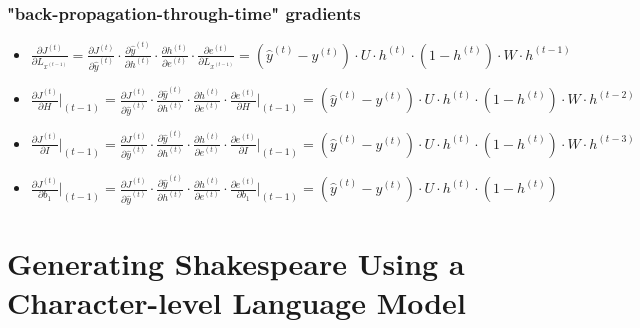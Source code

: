 \documentclass{article}
\begin{document}
\subsubsection{"back-propagation-through-time" gradients}
\begin{itemize}
    \item $\frac{\partial J^{(t)} }{\partial L_{x^{(t-1)}}} =  \frac{\partial J^{(t)} }{\partial \hat{y}^{(t)}} \cdot \frac{\partial \hat{y}^{(t)}}{\partial h^{(t)}} \cdot \frac{\partial h^{(t)}}{\partial e^{(t)}} \cdot \frac{\partial e^{(t)}}{\partial L_{x^{(t-1)}}} =
    (\hat{y}^{(t)} - y^{(t)}) \cdot U \cdot h^{(t)} \cdot (1 - h^{(t)}) \cdot W \cdot h^{(t-1)}$
    \item $\frac{\partial J^{(t)} }{\partial H} \vert_{(t-1)} =  \frac{\partial J^{(t)} }{\partial \hat{y}^{(t)}} \cdot \frac{\partial \hat{y}^{(t)}}{\partial h^{(t)}} \cdot \frac{\partial h^{(t)}}{\partial e^{(t)}} \cdot \frac{\partial e^{(t)}}{\partial H} \vert_{(t-1)} =
    (\hat{y}^{(t)} - y^{(t)}) \cdot U \cdot h^{(t)} \cdot (1 - h^{(t)}) \cdot W \cdot h^{(t-2)}$
    \item $\frac{\partial J^{(t)} }{\partial I} \vert_{(t-1)} =  \frac{\partial J^{(t)} }{\partial \hat{y}^{(t)}} \cdot \frac{\partial \hat{y}^{(t)}}{\partial h^{(t)}} \cdot \frac{\partial h^{(t)}}{\partial e^{(t)}} \cdot \frac{\partial e^{(t)}}{\partial I} \vert_{(t-1)} =
    (\hat{y}^{(t)} - y^{(t)}) \cdot U \cdot h^{(t)} \cdot (1 - h^{(t)}) \cdot W \cdot h^{(t-3)}$
    \item $\frac{\partial J^{(t)} }{\partial b_{1}} \vert_{(t-1)} =  \frac{\partial J^{(t)} }{\partial \hat{y}^{(t)}} \cdot \frac{\partial \hat{y}^{(t)}}{\partial h^{(t)}} \cdot \frac{\partial h^{(t)}}{\partial e^{(t)}} \cdot \frac{\partial e^{(t)}}{\partial b_{1}} \vert_{(t-1)} =
    (\hat{y}^{(t)} - y^{(t)}) \cdot U \cdot h^{(t)} \cdot (1 - h^{(t)})$

\end{itemize}
\section{Generating Shakespeare Using a Character-level Language Model} %
\end{document}
